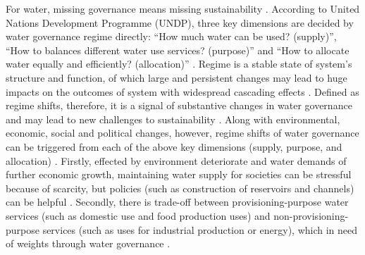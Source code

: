 \documentclass[9pt, twocolumn, twoside, lineno]{pnas-new}
\begin{document}
\label{introduction-section-2}
For water, missing governance means missing sustainability \cite{undpwatergovernancefacility2015}.
According to United Nations Development Programme (UNDP), three key dimensions are decided by water governance regime directly: ``How much water can be used? (supply)'', ``How to balances different water use services? (purpose)'' and ``How to allocate water equally and efficiently? (allocation)'' 
\cite{undpwatergovernancefacility2013,undpwatergovernancefacility2015,undpwatergovernancefacility2016}.
Regime is a stable state of system’s structure and function, of which large and persistent changes may lead to huge impacts on the outcomes of system with widespread cascading effects 
\cite{rocha2018,gregr2020}.
Defined as regime shifts, therefore, it is a signal of substantive changes in water governance and may lead to new challenges to sustainability 
\cite{steffen2020}.
Along with environmental, economic, social and political changes, however, regime shifts of water governance can be triggered from each of the above key dimensions (supply, purpose, and allocation)
\cite{undpwatergovernancefacility2013,undpwatergovernancefacility2015,undpwatergovernancefacility2016}.
Firstly, effected by environment deteriorate and water demands of further economic growth, maintaining water supply for societies can be stressful because of scarcity, but policies (such as construction of reservoirs and channels) can be helpful
\cite{greveGlobalAssessmentWater2018, wada2017, qin2019}.
Secondly, there is trade-off between provisioning-purpose water services (such as domestic use and food production uses) and non-provisioning-purpose services (such as uses for industrial production or energy), which in need of weights through water governance
\cite{liu2017, florke2018}.
\end{document}
